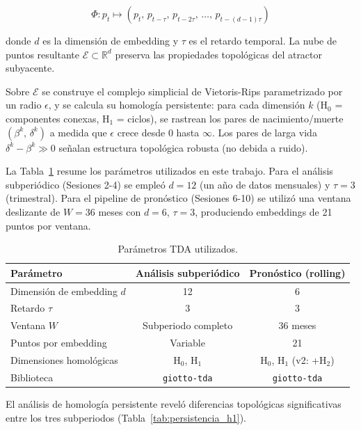 \documentclass[12pt, a4paper]{article}
\begin{document}
\begin{equation}
  \Phi: p_t \mapsto (p_t,\, p_{t-\tau},\, p_{t-2\tau},\, \ldots,\, p_{t-(d-1)\tau})
\end{equation}

donde $d$ es la dimensión de embedding y $\tau$ es el retardo temporal. La nube de puntos
resultante $\mathcal{E} \subset \mathbb{R}^d$ preserva las propiedades topológicas del atractor
subyacente.

Sobre $\mathcal{E}$ se construye el complejo simplicial de Vietoris-Rips parametrizado por un radio
$\epsilon$, y se calcula su homología persistente: para cada dimensión $k$ (H$_0$ = componentes
conexas, H$_1$ = ciclos), se rastrean los pares de nacimiento/muerte $(\beta^k,\, \delta^k)$ a
medida que $\epsilon$ crece desde 0 hasta $\infty$. Los pares de larga vida $\delta^k - \beta^k \gg 0$
señalan estructura topológica robusta (no debida a ruido).

La Tabla~\ref{tab:tda_params} resume los parámetros utilizados en este trabajo. Para el análisis
subperiódico (Sesiones 2-4) se empleó $d = 12$ (un año de datos mensuales) y $\tau = 3$
(trimestral). Para el pipeline de pronóstico (Sesiones 6-10) se utilizó una ventana deslizante
de $W = 36$ meses con $d = 6$, $\tau = 3$, produciendo embeddings de 21 puntos por ventana.

\begin{table}[H]
  \centering
  \caption{Parámetros TDA utilizados.}
  \label{tab:tda_params}
  \begin{tabular}{lcc}
    \toprule
    \textbf{Parámetro}         & \textbf{Análisis subperiódico} & \textbf{Pronóstico (rolling)} \\
    \midrule
    Dimensión de embedding $d$ & 12 & 6 \\
    Retardo $\tau$             & 3  & 3 \\
    Ventana $W$                & Subperiodo completo & 36 meses \\
    Puntos por embedding       & Variable & 21 \\
    Dimensiones homológicas    & H$_0$, H$_1$ & H$_0$, H$_1$ (v2: +H$_2$) \\
    Biblioteca                 & \texttt{giotto-tda} & \texttt{giotto-tda} \\
    \bottomrule
  \end{tabular}
\end{table}

El análisis de homología persistente reveló diferencias topológicas significativas entre los
tres subperiodos (Tabla~\ref{tab:persistencia_h1}).
\end{document}
